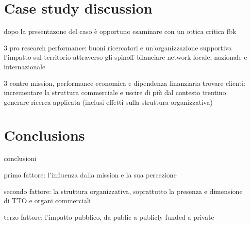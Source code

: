 

\label{Chapter8} %

\section{Case study discussion}

dopo la presentazone del caso è opportuno esaminare con un ottica critica fbk

3 pro
research performance: buoni ricercatori e un'organizzazione supportiva
l'impatto sul territorio attraverso gli spinoff
bilanciare network locale, nazionale e internazionale 

3 contro 
mission, performance economica e dipendenza finanziaria
trovare clienti: incrementare la struttura commerciale e uscire di più dal contesto trentino
generare ricerca applicata (inclusi effetti sulla struttura organizzativa)

\section{Conclusions}


conclusioni

primo fattore: l'influenza dalla mission e la sua percezione

secondo fattore: la struttura organizzativa, soprattutto la presenza e dimensione di TTO e organi commerciali

terzo fattore: l'impatto pubblico, da public a publicly-funded a private